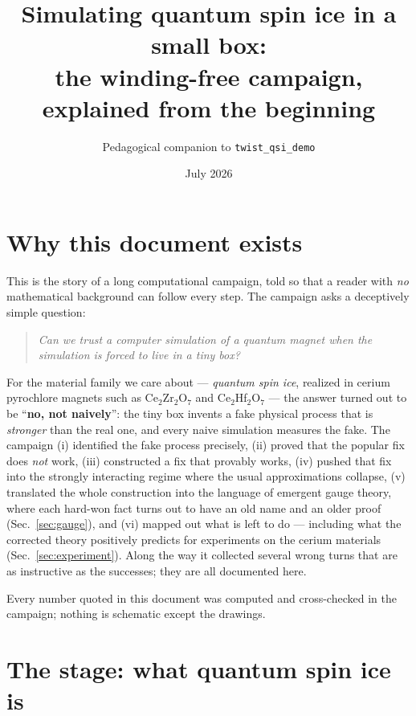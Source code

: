 \documentclass[11pt,a4paper]{article}
\title{\textbf{Simulating quantum spin ice in a small box:\\ the winding-free campaign, explained from the beginning}}
\author{Pedagogical companion to \texttt{twist\_qsi\_demo}}
\date{July 2026}
\begin{document}
\maketitle

\tableofcontents

\section{Why this document exists}

This is the story of a long computational campaign, told so that a reader with
\emph{no} mathematical background can follow every step.  The campaign asks a
deceptively simple question:

\begin{quote}
\emph{Can we trust a computer simulation of a quantum magnet when the
simulation is forced to live in a tiny box?}
\end{quote}

For the material family we care about --- \emph{quantum spin ice}, realized in
cerium pyrochlore magnets such as Ce$_2$Zr$_2$O$_7$ and Ce$_2$Hf$_2$O$_7$ ---
the answer turned out to be ``\textbf{no, not naively}'': the tiny box invents
a fake physical process that is \emph{stronger} than the real one, and every
naive simulation measures the fake.  The campaign (i) identified the fake
process precisely, (ii) proved that the popular fix does \emph{not} work,
(iii) constructed a fix that provably works, (iv) pushed that fix into the
strongly interacting regime where the usual approximations collapse,
(v) translated the whole construction into the language of emergent gauge
theory, where each hard-won fact turns out to have an old name and an older
proof (Sec.~\ref{sec:gauge}), and (vi) mapped out what is left to do ---
including what the corrected theory positively predicts for experiments on
the cerium materials (Sec.~\ref{sec:experiment}).  Along the way it collected several wrong
turns that are as instructive as the successes; they are all documented here.

Every number quoted in this document was computed and cross-checked in the
campaign; nothing is schematic except the drawings.

\section{The stage: what quantum spin ice is}
\end{document}
